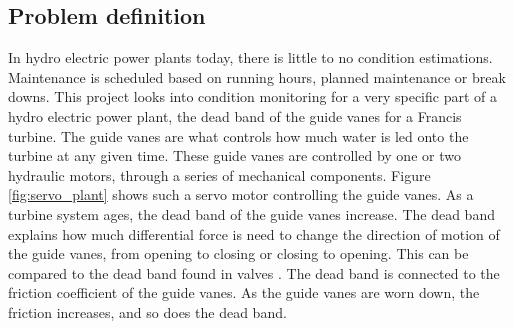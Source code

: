     \subsection{Problem definition}    
        In hydro electric power plants today, there is little to no condition estimations. Maintenance is scheduled based on running hours, planned maintenance or break downs. This project looks into condition monitoring for a very specific part of a hydro electric power plant, the dead band of the guide vanes for a Francis turbine. The guide vanes are what controls  how much water is led onto the turbine at any given time. These guide vanes are controlled by one or two hydraulic motors, through a series of mechanical components. Figure \ref{fig:servo_plant} shows such a servo motor controlling the guide vanes. As a turbine system ages, the dead band of the guide vanes increase. The dead band explains how much differential force is need to change the direction of motion of the guide vanes, from opening to closing or closing to opening. This can be compared to the dead band found in valves \cite{Choudhury2005}. The dead band is connected to the friction coefficient of the guide vanes. As the guide vanes are worn down, the friction increases, and so does the dead band.  
        
    
